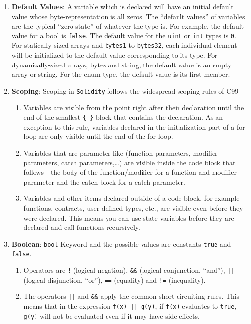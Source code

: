 \begin{enumerate}
\item\textbf{Default Values}: A variable which is declared will have an initial default value whose byte-representation is all zeros. The “default values” of variables are the typical “zero-state” of whatever the type is. For example, the default value for a bool is \verb|false|. The default value for the \verb|uint| or \verb|int| types is \verb|0|. For statically-sized arrays and \verb|bytes1| to \verb|bytes32|, each individual element will be initialized to the default value corresponding to its type. For dynamically-sized arrays, bytes and string, the default value is an empty array or string. For the enum type, the default value is its first member.

\item\textbf{Scoping}: Scoping in \verb|Solidity| follows the widespread scoping rules of C99
    \begin{enumerate}
    \item Variables are visible from the point right after their declaration until the end of the smallest \verb|{ }|-block that contains the declaration. As an exception to this rule, variables declared in the initialization part of a for-loop are only visible until the end of the for-loop.
    \item Variables that are parameter-like (function parameters, modifier parameters, catch parameters,\dots) are visible inside the code block that follows - the body of the function/modifier for a function and modifier parameter and the catch block for a catch parameter.
    \item Variables and other items declared outside of a code block, for example functions, contracts, user-defined types, etc., are visible even before they were declared. This means you can use state variables before they are declared and call functions recursively.
    \end{enumerate}

\item\textbf{Boolean}: \verb|bool| Keyword and the possible values are constants \verb|true| and \verb|false|.
    \begin{enumerate}
    \item Operators are \verb|!| (logical negation), \verb|&&| (logical conjunction, “and”), \verb!||! (logical disjunction, “or”), \verb|==| (equality) and \verb|!=| (inequality).
    \item The operators \verb!||! and \verb|&&| apply the common short-circuiting rules. This means that in the expression \verb!f(x) || g(y)!, if \verb|f(x)| evaluates to \verb|true|, \verb|g(y)| will not be evaluated even if it may have side-effects.
    \end{enumerate}


\end{enumerate}
